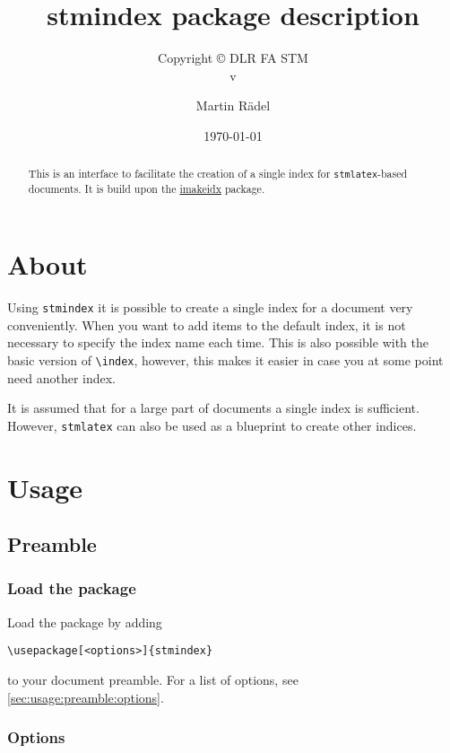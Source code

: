 \documentclass[%
  type=article,%
  layout=koma,%
  date=true,%
  hyperref=true,%
  index=false,%
  listings=true%
]{stmtext}
\author{Martin R\"{a}del}
\title{stmindex package description}
\subtitle{Copyright \copyright{} \the\year{} DLR FA STM\\v\formatdate[versiondatestyle]{\DTMToday}}
\date{\today}
\begin{document}
\maketitle

\begin{abstract}
This is an interface to facilitate the creation of a single index for \texttt{stmlatex}-based documents. It is build upon the \href{https://ctan.org/pkg/imakeidx}{imakeidx} package.
\end{abstract}

\tableofcontents

\section{About}

Using \texttt{stmindex} it is possible to create a single index for a document very conveniently. When you want to add items to the default index, it is not necessary to specify the index name each time. This is also possible with the basic version of \verb+\index+, however, this makes it easier in case you at some point need another index.

It is assumed that for a large part of documents a single index is sufficient. However, \texttt{stmlatex} can also be used as a blueprint to create other indices.

\section{Usage}%

\subsection{Preamble}

\subsubsection{Load the package}

Load the package by adding

\begin{verbatim}
\usepackage[<options>]{stmindex}
\end{verbatim}

to your document preamble. For a list of options, see \autoref{sec:usage:preamble:options}.

\subsubsection{Options}
\label{sec:usage:preamble:options}
\end{document}
